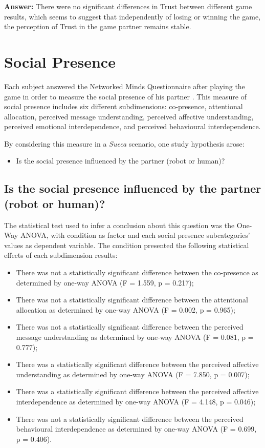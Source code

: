 \textbf{Answer:} There were no significant differences in Trust between different game results, which seems to suggest that independently of losing or winning the game, the perception of Trust in the game partner remains stable.


\section{Social Presence}
\label{sec:socialPresence}
Each subject answered the Networked Minds Questionnaire after playing the game in order to measure the social presence of his partner \cite{Harms2004}.
This measure of social presence includes six different subdimensions: co-presence, attentional allocation, perceived message understanding, perceived affective understanding, perceived emotional interdependence, and perceived behavioural interdependence.

By considering this measure in a \emph{Sueca} scenario, one study hypothesis arose:
\begin{itemize}
\item Is the social presence influenced by the partner (robot or human)?
\end{itemize}

\subsection*{Is the social presence influenced by the partner (robot or human)?}
The statistical test used to infer a conclusion about this question was the One-Way ANOVA, with condition as factor and each social presence subcategories' values as dependent variable.
The condition presented the following statistical effects of each subdimension results:
\begin{itemize}
\item There was not a statistically significant difference between the co-presence as determined by one-way ANOVA (F = 1.559, p = 0.217);
\item There was not a statistically significant difference between the attentional allocation as determined by one-way ANOVA (F = 0.002, p = 0.965);
\item There was not a statistically significant difference between the perceived message understanding as determined by one-way ANOVA (F = 0.081, p = 0.777);
\item There was a statistically significant difference between the perceived affective understanding as determined by one-way ANOVA (F = 7.850, p = 0.007);
\item There was a statistically significant difference between the perceived affective interdependence as determined by one-way ANOVA (F = 4.148, p = 0.046);
\item There was not a statistically significant difference between the perceived behavioural interdependence as determined by one-way ANOVA (F = 0.699, p = 0.406).
\end{itemize}


